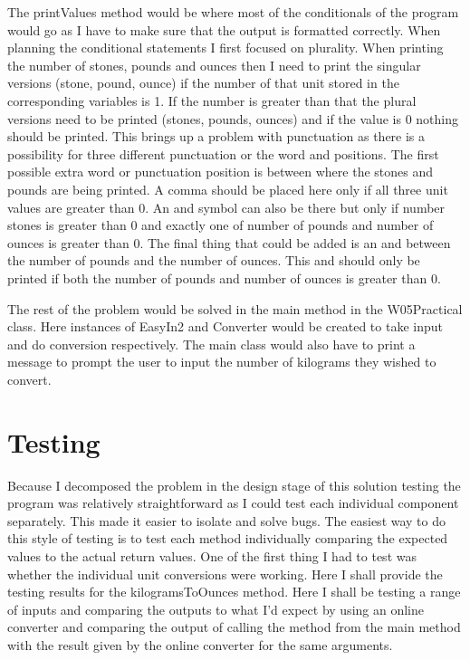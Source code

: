 \documentclass[a4paper]{article}
\begin{document}
The printValues method would be where most of the conditionals of the program would go as I have to make sure that the output is formatted correctly. 
When planning the conditional statements I first focused on plurality. When printing the number of stones, pounds and ounces then I need to print the 
singular versions (stone, pound, ounce) if the number of that unit stored in the corresponding variables is 1. If the number is greater than that the 
plural versions need to be printed (stones, pounds, ounces) and if the value is 0 nothing should be printed. This brings up a problem with punctuation 
as there is a possibility for three different punctuation or the word and positions. The first possible extra word or punctuation position is between 
where the stones and pounds are being printed. A comma should be placed here only if all three unit values are greater than 0. An and symbol can also be there but only if number 
stones is greater than 0 and exactly one of number of pounds and number of ounces is greater than 0. The final thing that could be added is an and 
between the number of pounds and the number of ounces. This and should only be printed if both the number of pounds and number of ounces is greater 
than 0.

The rest of the problem would be solved in the main method in the W05Practical class. Here instances of EasyIn2 and Converter would be created to 
take input and do conversion respectively. The main class would also have to print a message to prompt the user to input the number of kilograms they 
wished to convert.

\section*{Testing}
Because I decomposed the problem in the design stage of this solution testing the program was relatively straightforward as I could test each 
individual component separately. This made it easier to isolate and solve bugs. The easiest way to do this style of testing is to test each method 
individually comparing the expected values to the actual return values. One of the first thing I had to test was whether the individual unit 
conversions were working. Here I shall provide the testing results for the kilogramsToOunces method. Here I shall be testing a range of inputs and 
comparing the outputs to what I'd expect by using an online converter and comparing the output of calling the method from the main method with the 
result given by the online converter for the same arguments.
\end{document}
